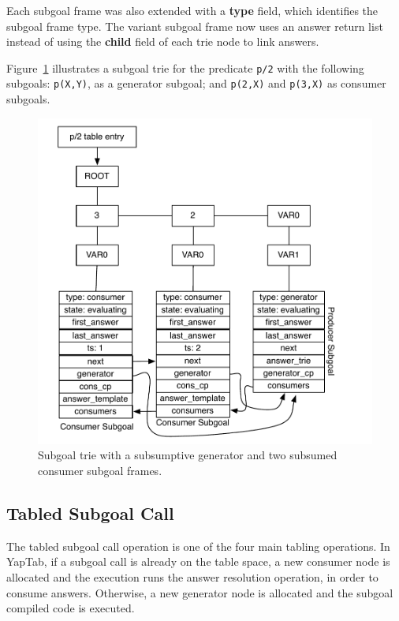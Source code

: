 Each subgoal frame was also extended with a \textbf{type} field, which identifies the subgoal frame type.
The variant subgoal frame now uses an answer return list instead of using the \textbf{child} field of
each trie node to link answers.

Figure~\ref{fig:subgoal_frames} illustrates a subgoal trie for the predicate \texttt{p/2}
with the following subgoals: \texttt{p(X,Y)}, as a generator subgoal; and \texttt{p(2,X)} and
\texttt{p(3,X)} as consumer subgoals.

\begin{figure}[h]
  \centering
    \includegraphics[scale=0.6]{subgoal_frames.pdf}
  \caption{Subgoal trie with a subsumptive generator and two subsumed consumer subgoal frames.}
  \label{fig:subgoal_frames}
\end{figure}

\subsection{Tabled Subgoal Call}

The tabled subgoal call operation is one of the four main tabling operations. In YapTab,
if a subgoal call is already on the table space, a new consumer node is allocated and
the execution runs the answer resolution operation, in order to consume answers.
Otherwise, a new generator node is allocated and the subgoal compiled code is executed.

